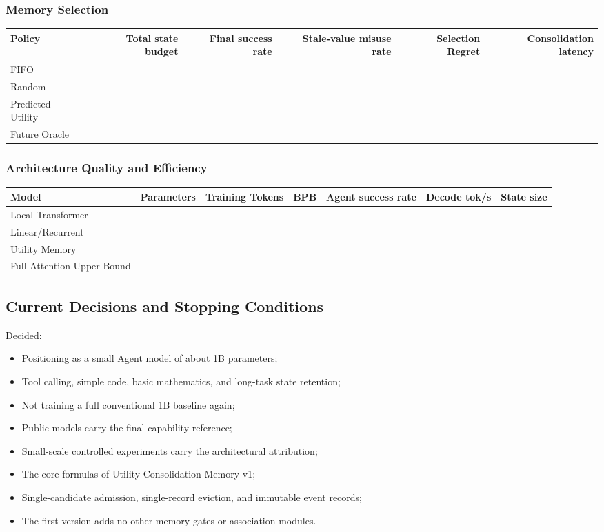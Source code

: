 \subsubsection{Memory Selection}

\begin{table}[htbp]\centering
\begin{tabular}{lrrrrr}\toprule
Policy & Total state budget & Final success rate & Stale-value misuse rate & Selection Regret & Consolidation latency\\
\midrule
FIFO & & & & & \\
Random & & & & & \\
Predicted Utility & & & & & \\
Future Oracle & & & & & \\
\bottomrule
\end{tabular}
\end{table}

\subsubsection{Architecture Quality and Efficiency}

\begin{table}[htbp]\centering
\begin{tabular}{lrrrrrr}\toprule
Model & Parameters & Training Tokens & BPB & Agent success rate & Decode tok/s & State size\\
\midrule
Local Transformer & & & & & & \\
Linear/Recurrent & & & & & & \\
Utility Memory & & & & & & \\
Full Attention Upper Bound & & & & & & \\
\bottomrule
\end{tabular}
\end{table}

\subsection{Current Decisions and Stopping Conditions}

Decided:

\begin{itemize}
  \item Positioning as a small Agent model of about 1B parameters;
  \item Tool calling, simple code, basic mathematics, and long-task state retention;
  \item Not training a full conventional 1B baseline again;
  \item Public models carry the final capability reference;
  \item Small-scale controlled experiments carry the architectural attribution;
  \item The core formulas of Utility Consolidation Memory v1;
  \item Single-candidate admission, single-record eviction, and immutable event records;
  \item The first version adds no other memory gates or association modules.
\end{itemize}

